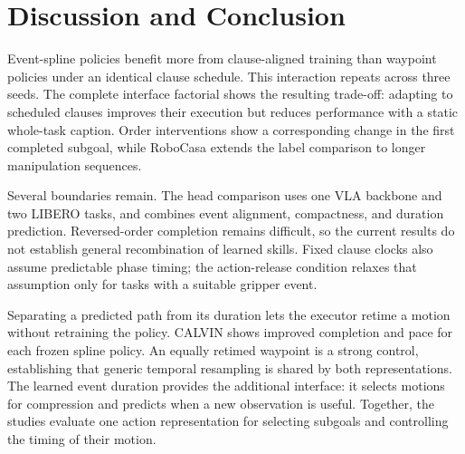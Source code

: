 \section{Discussion and Conclusion}
\label{sec:discussion}

Event-spline policies benefit more from clause-aligned training than waypoint policies under an identical clause schedule. This interaction repeats across three seeds. The complete interface factorial shows the resulting trade-off: adapting to scheduled clauses improves their execution but reduces performance with a static whole-task caption. Order interventions show a corresponding change in the first completed subgoal, while RoboCasa extends the label comparison to longer manipulation sequences.

Several boundaries remain. The head comparison uses one VLA backbone and two LIBERO tasks, and combines event alignment, compactness, and duration prediction. Reversed-order completion remains difficult, so the current results do not establish general recombination of learned skills. Fixed clause clocks also assume predictable phase timing; the action-release condition relaxes that assumption only for tasks with a suitable gripper event.

Separating a predicted path from its duration lets the executor retime a motion without retraining the policy. CALVIN shows improved completion and pace for each frozen spline policy. An equally retimed waypoint is a strong control, establishing that generic temporal resampling is shared by both representations. The learned event duration provides the additional interface: it selects motions for compression and predicts when a new observation is useful. Together, the studies evaluate one action representation for selecting subgoals and controlling the timing of their motion.
